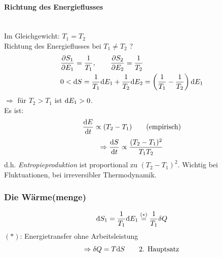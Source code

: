 \paragraph{Richtung des Energieflusses} \mbox{}\\
Im Gleichgewicht: $T_1 = T_2$ \\
Richtung des Energieflusses bei $T_1 \neq T_2$ ?
\begin{equation}
    \begin{split}
        & \frac{\partial S_1}{\partial E_1} = \frac{1}{T_1}, \qquad \frac{\partial S_2}{\partial E_2} = \frac{1}{T_2} \\
        & 0 < \mathrm{d} S = \frac{1}{T_1} \mathrm{d} E_1 + \frac{1}{T_2} \mathrm{d} E_2 = \left( \frac{1}{T_1} - \frac{1}{T_2} \right) \mathrm{d} E_1
    \end{split}
\end{equation}
$\Rightarrow$ für $T_2 > T_1$ ist $\mathrm{d} E_1 > 0$. \\
Es ist:
\begin{equation}
    \frac{\mathrm{d} E}{\mathrm{d} t} \propto (T_2 - T_1) \qquad \text{(empirisch)}
\end{equation}
\begin{equation}
    \Rightarrow \frac{\mathrm{d} S}{\mathrm{d} t} \propto \frac{(T_2 - T_1)^2}{T_1 T_2}
\end{equation}
d.h. \emph{Entropieproduktion} ist proportional zu $(T_2 - T_1)^2$. Wichtig bei Fluktuationen, bei irreversibler Thermodynamik.

\subsubsection{Die Wärme(menge)}
\begin{equation}
    \mathrm{d} S_1 = \frac{1}{T_1} \mathrm{d} E_1 \overset{(*)}{=} \frac{1}{T_1} \delta Q
\end{equation}
$(*)$: Energietransfer ohne Arbeitsleistung
\begin{equation}
    \Rightarrow \delta Q = T \mathrm{d} S \qquad \text{2. Hauptsatz}
\end{equation}
